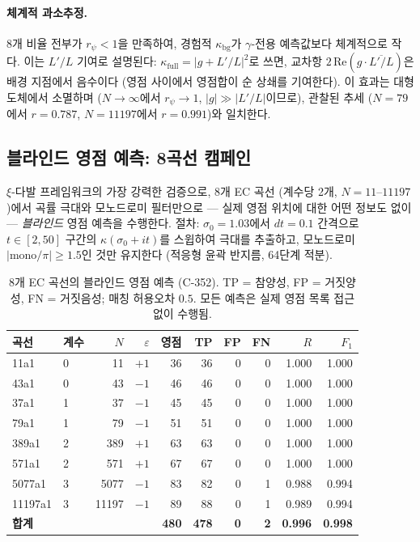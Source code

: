 \documentclass[11pt, a4paper]{article}
\theoremstyle{plain}
\theoremstyle{definition}
\begin{document}
\paragraph{체계적 과소추정.}
8개 비율 전부가 $r_{\psi} < 1$을 만족하여,
경험적 $\kappa_{\mathrm{bg}}$가 $\gamma$-전용 예측값보다
체계적으로 작다.  이는 $L'/L$ 기여로 설명된다:
$\kappa_{\mathrm{full}} = |g + L'/L|^{2}$로 쓰면,
교차항 $2\,\mathrm{Re}(g\cdot\overline{L'/L})$은
배경 지점에서 음수이다 (영점 사이에서 영점합이
순 상쇄를 기여한다).
이 효과는 대형 도체에서 소멸하며
($N\to\infty$에서 $r_{\psi}\to 1$, $|g|\gg|L'/L|$이므로),
관찰된 추세 ($N=79$에서 $r=0.787$, $N=11197$에서 $r=0.991$)와 일치한다.


\subsection{블라인드 영점 예측: 8곡선 캠페인}
\label{ssec:blind}

$\xi$-다발 프레임워크의 가장 강력한 검증으로,
8개 EC 곡선 (계수당 2개, $N=11$--$11197$)에서
곡률 극대와 모노드로미 필터만으로 — 실제 영점 위치에 대한
어떤 정보도 없이 — \emph{블라인드} 영점 예측을 수행한다.
절차: $\sigma_{0}=1.03$에서 $dt=0.1$ 간격으로
$t\in[2,50]$ 구간의 $\kappa(\sigma_{0}+it)$를 스윕하여
극대를 추출하고, 모노드로미 $|\mathrm{mono}/\pi| \geq 1.5$인
것만 유지한다 (적응형 윤곽 반지름, 64단계 적분).

\begin{table}[ht]
\centering
\caption{8개 EC 곡선의 블라인드 영점 예측 (C-352).
  TP = 참양성, FP = 거짓양성, FN = 거짓음성;
  매칭 허용오차 $0.5$.  모든 예측은 실제 영점 목록 접근 없이 수행됨.}
\label{tab:blind}
\small
\begin{tabular}{llrrrrrrrr}
\toprule
곡선 & 계수 & $N$ & $\varepsilon$ & 영점 & TP & FP & FN & $R$ & $F_{1}$ \\
\midrule
11a1    & 0 &    11 & $+1$ & 36  & 36 & 0 & 0 & 1.000 & 1.000 \\
43a1    & 0 &    43 & $-1$ & 46  & 46 & 0 & 0 & 1.000 & 1.000 \\
37a1    & 1 &    37 & $-1$ & 45  & 45 & 0 & 0 & 1.000 & 1.000 \\
79a1    & 1 &    79 & $-1$ & 51  & 51 & 0 & 0 & 1.000 & 1.000 \\
389a1   & 2 &   389 & $+1$ & 63  & 63 & 0 & 0 & 1.000 & 1.000 \\
571a1   & 2 &   571 & $+1$ & 67  & 67 & 0 & 0 & 1.000 & 1.000 \\
5077a1  & 3 &  5077 & $-1$ & 83  & 82 & 0 & 1 & 0.988 & 0.994 \\
11197a1 & 3 & 11197 & $-1$ & 89  & 88 & 0 & 1 & 0.989 & 0.994 \\
\midrule
\multicolumn{4}{l}{\textbf{합계}} & \textbf{480} & \textbf{478} &
  \textbf{0} & \textbf{2} & \textbf{0.996} & \textbf{0.998} \\
\bottomrule
\end{tabular}
\end{table}
\end{document}
